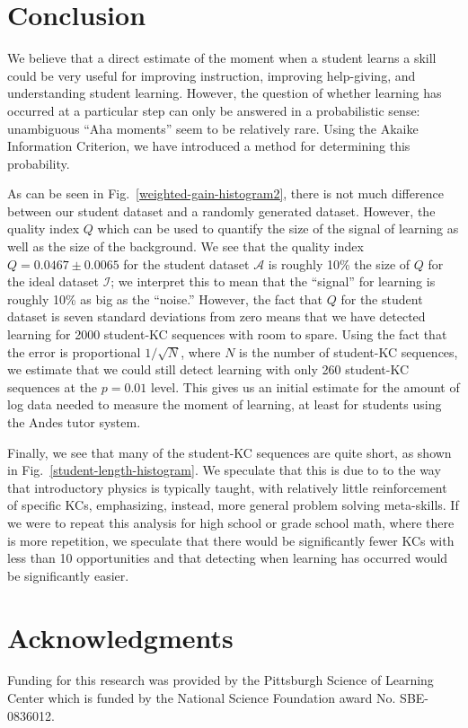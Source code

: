 \documentclass{edm_template}
\begin{document}
\section{Conclusion}

We believe that a direct estimate of the moment when a student
learns a skill could be very useful for improving instruction,
improving help-giving, and understanding student learning.
However, the question of whether learning has occurred at a particular
step can only be answered in a probabilistic sense:
unambiguous ``Aha moments'' seem to be relatively rare.
Using the Akaike Information Criterion, we have introduced a method
for determining this probability.

As can be seen in
Fig.~\ref{weighted-gain-histogram2}, there is not much difference
between our student dataset and a randomly generated dataset.  However,
the quality index $Q$ which can be used to quantify the
size of the signal of learning as well as the size of the background.  
We see that the quality index
$Q=0.0467\pm0.0065$ for the student dataset $\mathcal{A}$ is roughly
10\% the size of $Q$ for the ideal dataset $\mathcal{I}$; we interpret
this to mean that the ``signal'' for learning is roughly 10\% as big as the
``noise.''  However, the fact that $Q$ for the student dataset is
seven standard deviations from zero means that we have detected
learning for 2000 student-KC sequences with room to spare.  Using the fact
that the error is proportional $1/\sqrt{N}$, where $N$ is the number 
of student-KC sequences, we estimate
that we could still detect learning with only 260 student-KC sequences at the
$p=0.01$ level.  This gives us an initial estimate for the amount of
log data needed to measure the moment of learning, at least for
students using the Andes tutor system.

Finally, we see that many of
the student-KC sequences are quite short, as shown in
Fig.~\ref{student-length-histogram}. 
 We speculate that this
is due to to the way that introductory physics is typically taught, 
with relatively little reinforcement of specific KCs, emphasizing, 
instead, more general problem solving meta-skills.  If we were to 
repeat this
analysis for high school or grade school math, where there is more
repetition, we speculate that there would be significantly fewer KCs
with less than 10 opportunities and that detecting when learning has
occurred would be significantly easier.


\section{Acknowledgments}
Funding for this research was provided by the Pittsburgh Science of
Learning Center which is funded by the National Science Foundation
award No. SBE-0836012.

%


\end{document}
